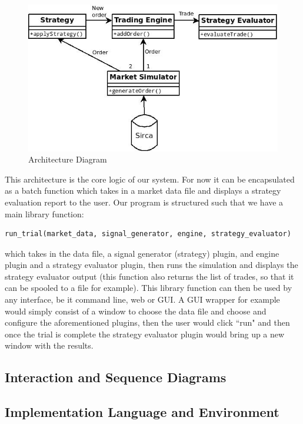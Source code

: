 \documentclass{article}
\begin{document}
\begin{figure}
  \centering
  \includegraphics[width=\textwidth]{architecture}
  \caption{Architecture Diagram}
\end{figure}

This architecture is the core logic of our system. For now it can be encapsulated as a batch function which takes in a market data file and displays a strategy evaluation report to the user. Our program is structured such that we have a main library function:
\begin{verbatim}
run_trial(market_data, signal_generator, engine, strategy_evaluator)
\end{verbatim}

which takes in the data file, a signal generator (strategy) plugin, and engine plugin and a strategy evaluator plugin, then runs the simulation and displays the strategy evaluator output (this function also returns the list of trades, so that it can be spooled to a file for example). This library function can then be used by any interface, be it command line, web or GUI\@. A GUI wrapper for example would simply consist of a window to choose the data file and choose and configure the aforementioned plugins, then the user would click ``run" and then once the trial is complete the strategy evaluator plugin would bring up a new window with the results.

\subsection{Interaction and Sequence Diagrams}

\subsection{Implementation Language and Environment}
\end{document}
